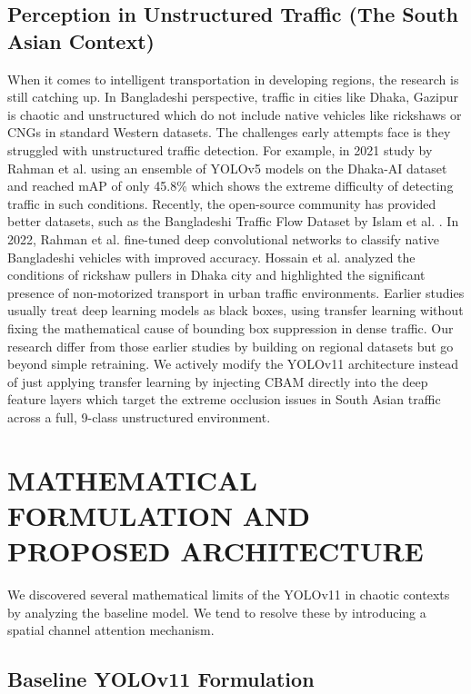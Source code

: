 \documentclass[conference]{IEEEtran}
\begin{document}
\subsection{Perception in Unstructured Traffic (The South Asian Context)}
When it comes to intelligent transportation in developing regions, the research is still catching up. In Bangladeshi perspective, traffic in cities like Dhaka, Gazipur is chaotic and unstructured which do not include native vehicles like rickshaws or CNGs in standard Western datasets. The challenges early attempts face is they struggled with unstructured traffic detection. For example, in 2021 study by Rahman et al.\cite{rahman2021densely} using an ensemble of YOLOv5 models on the Dhaka-AI dataset and reached mAP of only 45.8\% which shows the extreme difficulty of detecting traffic in such conditions. Recently, the open-source community has provided better datasets, such as the Bangladeshi Traffic Flow Dataset by Islam et al. \cite{Islam2025BangladeshiTrafficFlow}. In 2022, Rahman et al.\cite{rahman2022fine} fine-tuned deep convolutional networks to classify native Bangladeshi vehicles with improved accuracy. Hossain et al.\cite{17a} analyzed the conditions of rickshaw pullers in Dhaka city and highlighted the significant presence of non-motorized transport in urban traffic environments. Earlier studies usually treat deep learning models as black boxes, using transfer learning without fixing the mathematical cause of bounding box suppression in dense traffic. Our research differ from those earlier studies by building on regional datasets but go beyond simple retraining. We actively modify the YOLOv11 architecture instead of just applying transfer learning by injecting CBAM directly into the deep feature layers which target the extreme occlusion issues in South Asian traffic across a full, 9-class unstructured environment.

\section{MATHEMATICAL FORMULATION AND PROPOSED ARCHITECTURE}
We discovered several mathematical limits of the YOLOv11 in chaotic contexts by analyzing the baseline model. We tend to resolve these by introducing a spatial channel attention mechanism. 


\subsection{Baseline YOLOv11 Formulation}
\end{document}

